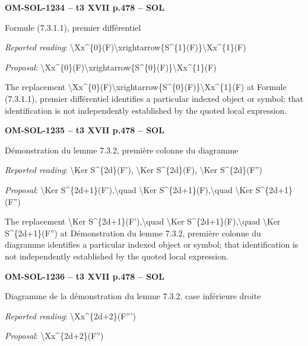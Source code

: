 \par\noindent\textbf{OM-SOL-1234 -- t3 XVII p.478 -- SOL}\par
Formule (7.3.1.1), premier différentiel\par
\emph{Reported reading}: \textbackslash{}Xx\textasciicircum{}\{0\}(F)\textbackslash{}xrightarrow\{S\textasciicircum{}\{1\}(F)\}\textbackslash{}Xx\textasciicircum{}\{1\}(F)\par
\emph{Proposal}: \textbackslash{}Xx\textasciicircum{}\{0\}(F)\textbackslash{}xrightarrow\{S\textasciicircum{}\{0\}(F)\}\textbackslash{}Xx\textasciicircum{}\{1\}(F)\par
The replacement \textbackslash{}Xx\textasciicircum{}\{0\}(F)\textbackslash{}xrightarrow\{S\textasciicircum{}\{0\}(F)\}\textbackslash{}Xx\textasciicircum{}\{1\}(F) at Formule (7.3.1.1), premier différentiel identifies a particular indexed object or symbol; that identification is not independently established by the quoted local expression.\par
\par\noindent\textbf{OM-SOL-1235 -- t3 XVII p.478 -- SOL}\par
Démonstration du lemme 7.3.2, première colonne du diagramme\par
\emph{Reported reading}: \textbackslash{}Ker S\textasciicircum{}\{2d\}(F'), \textbackslash{}Ker S\textasciicircum{}\{2d\}(F), \textbackslash{}Ker S\textasciicircum{}\{2d\}(F'')\par
\emph{Proposal}: \textbackslash{}Ker S\textasciicircum{}\{2d+1\}(F'),\textbackslash{}quad \textbackslash{}Ker S\textasciicircum{}\{2d+1\}(F),\textbackslash{}quad \textbackslash{}Ker S\textasciicircum{}\{2d+1\}(F'')\par
The replacement \textbackslash{}Ker S\textasciicircum{}\{2d+1\}(F'),\textbackslash{}quad \textbackslash{}Ker S\textasciicircum{}\{2d+1\}(F),\textbackslash{}quad \textbackslash{}Ker S\textasciicircum{}\{2d+1\}(F'') at Démonstration du lemme 7.3.2, première colonne du diagramme identifies a particular indexed object or symbol; that identification is not independently established by the quoted local expression.\par
\par\noindent\textbf{OM-SOL-1236 -- t3 XVII p.478 -- SOL}\par
Diagramme de la démonstration du lemme 7.3.2, case inférieure droite\par
\emph{Reported reading}: \textbackslash{}Xx\textasciicircum{}\{2d+2\}(F''')\par
\emph{Proposal}: \textbackslash{}Xx\textasciicircum{}\{2d+2\}(F'')\par
